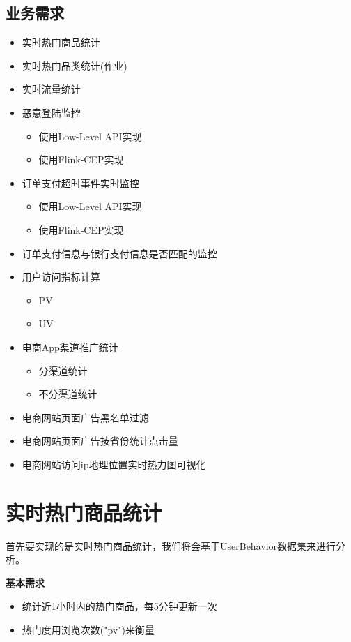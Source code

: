 \documentclass[oneside]{ctexbook}
\begin{document}
\subsection{业务需求}

\begin{itemize}
  \item 实时热门商品统计
  \item 实时热门品类统计(作业)
  \item 实时流量统计
  \item 恶意登陆监控
    \begin{itemize}
      \item 使用Low-Level API实现
      \item 使用Flink-CEP实现
    \end{itemize}
  \item 订单支付超时事件实时监控
    \begin{itemize}
      \item 使用Low-Level API实现
      \item 使用Flink-CEP实现
    \end{itemize}
  \item 订单支付信息与银行支付信息是否匹配的监控
  \item 用户访问指标计算
    \begin{itemize}
      \item PV
      \item UV
    \end{itemize}
  \item 电商App渠道推广统计
    \begin{itemize}
      \item 分渠道统计
      \item 不分渠道统计
    \end{itemize}
  \item 电商网站页面广告黑名单过滤
  \item 电商网站页面广告按省份统计点击量
  \item 电商网站访问ip地理位置实时热力图可视化
\end{itemize}

\section{实时热门商品统计}

首先要实现的是实时热门商品统计，我们将会基于UserBehavior数据集来进行分析。

\textbf{基本需求}

\begin{itemize}
\item 统计近1小时内的热门商品，每5分钟更新一次
\item 热门度用浏览次数("pv")来衡量
\end{itemize}
\end{document}
